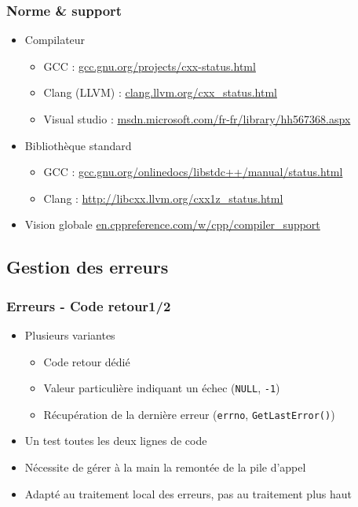 \documentclass[C++.tex]{subfiles}
\begin{document}
\begin{frame}
	\frametitle{Norme \& support}
	\begin{itemize}
		\item Compilateur
		\begin{itemize}
			\item GCC : \href{https://gcc.gnu.org/projects/cxx-status.html}{gcc.gnu.org/projects/cxx-status.html}
			\item Clang (LLVM) : \href{http://clang.llvm.org/cxx_status.html}{clang.llvm.org/cxx\_status.html}
			\item Visual studio : \href{https://msdn.microsoft.com/fr-fr/library/hh567368.aspx}{msdn.microsoft.com/fr-fr/library/hh567368.aspx}
		\end{itemize}
		\item Bibliothèque standard
		\begin{itemize}
			\item GCC : \href{https://gcc.gnu.org/onlinedocs/libstdc++/manual/status.html}{gcc.gnu.org/onlinedocs/libstdc++/manual/status.html}
			\item Clang : \url{http://libcxx.llvm.org/cxx1z_status.html}
		\end{itemize}
		\item Vision globale \href{http://en.cppreference.com/w/cpp/compiler_support}{en.cppreference.com/w/cpp/compiler\_support}
	\end{itemize}
\end{frame}

\subsection*{Gestion des erreurs}
\begin{frame}
	\frametitle{Erreurs - Code retour\titlehfill{}1/2}


	\begin{itemize}
		\item Plusieurs variantes
		\begin{itemize}
			\item Code retour dédié
			\item Valeur particulière indiquant un échec (\lstinline|NULL|, \lstinline|-1|)
			\item Récupération de la dernière erreur (\lstinline|errno|, \lstinline|GetLastError()|)
		\end{itemize}
		\item \og Un test toutes les deux lignes de code\fg{}
		\item Nécessite de gérer \og à la main\fg{} la remontée de la pile d'appel
		\item Adapté au traitement local des erreurs, pas au traitement \og plus haut\fg{}
	\end{itemize}
\end{frame}
\end{document}
